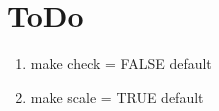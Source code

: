 
\section{ToDo}

\begin{enumerate}
\item make check = FALSE default
\item make scale = TRUE default
\end{enumerate}

